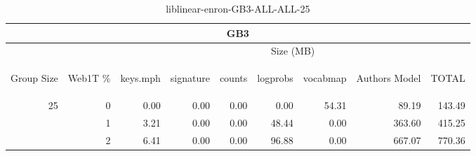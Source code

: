 \begin{center}
\begin{table}[htbp] 
 \begin{center}
\begin{tabular}{ | r | r | r | r | r | r | r | r | r |}
\hline
\multicolumn{9}{|c|}{GB3}\\
\hline
 & & \multicolumn{7}{|c|}{Size (MB)}\\ \cline{3-9}
\begin{sideways}Group Size\end{sideways} & \begin{sideways}Web1T \% \end{sideways} & \begin{sideways}keys.mph\end{sideways} & \begin{sideways}signature\end{sideways} & \begin{sideways}counts\end{sideways} & \begin{sideways}logprobs\end{sideways} & \begin{sideways}vocabmap\end{sideways} & \begin{sideways}Authors Model \end{sideways} & \begin{sideways}TOTAL\end{sideways}\\
\hline
\multirow{2}{*}{25}
 & 0 & 0.00 & 0.00 & 0.00 & 0.00 & 54.31 & 89.19 & 143.49\\ \cline{2-9}
 & 1 & 3.21 & 0.00 & 0.00 & 48.44 & 0.00 & 363.60 & 415.25\\ \cline{2-9}
 & 2 & 6.41 & 0.00 & 0.00 & 96.88 & 0.00 & 667.07 & 770.36\\ \cline{2-9}
\hline
\end{tabular}
\caption{liblinear-enron-GB3-ALL-ALL-25}
\label{table:liblinear-enron-GB3-ALL-ALL-25}
\end{center}
 \end{table}
\end{center}


